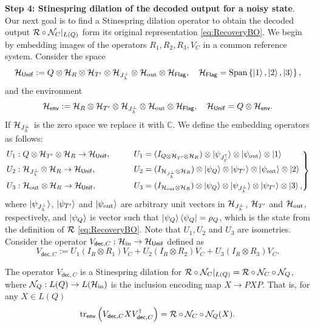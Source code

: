 \documentclass[10pt]{article}
\DeclareMathOperator{\Span}{Span}
\newcommand{\SIN}{\mathrm{in}}
\newcommand{\SOUT}{\mathrm{out}}
\newcommand{\tr}{\mathrm{tr}}
\newcommand{\C}{\mathbb{C}}
\newcommand{\p}[1]{\left(#1\right)}
\newcommand{\ppp}[1]{\left\{#1\right\}}
\newcommand{\s}[1]{\mathsf{#1}}
\begin{document}
\noindent\textbf{Step 4: Stinespring dilation of the decoded output for a noisy state}. Our next goal is to find a Stinespring dilation operator to obtain the decoded output ${\cal R}\circ{\cal N}_C|_{L(Q)}$ form its original representation \eqref{eq:RecoveryBO}. We begin by embedding images of the operators $R_1,R_2,R_3, V_{C}$ in a common reference system. Consider the space
\[\calH_{\s{Unif}}:=Q\otimes \calH_{R}\otimes \calH_{T'}\otimes \calH_{J_{\lambda}^\perp}\otimes \calH_{\SOUT}\otimes \calH_{\s{Flag}}, \quad \calH_{\s{Flag}}=\Span\ppp{\ket{1},\ket{2},\ket{3}},\]
and the environment 
\begin{equation}
    \calH_{\s{env}}:= \calH_{R}\otimes \calH_{T'}\otimes \calH_{J_{\lambda}^\perp}\otimes \calH_{\SOUT}\otimes \calH_{\s{Flag}}, \quad  \calH_{\s{Unif}}=Q\otimes \calH_{\s{env}}.\label{eq:Henv}
\end{equation}
If ${\cal H}_{J_{\lambda}^{\perp}}$ is the zero space we replace it with $\C$. We define the embedding operators as follows: 
    \begin{equation}
\left.
\begin{aligned}
&U_1:Q\otimes \calH_{T'}\otimes \calH_R\to \calH_{\s{Unif}},
\qquad&&U_1= (I_{Q\otimes \calH_{T'}\otimes \calH_R})\otimes \ket{\psi_{J_\calE^\dag}}
\otimes \ket{\psi_{\SOUT}}\otimes \ket{1}\\
&U_2:\calH_{J_{\lambda}^\perp}\otimes \calH_R\to \calH_{\s{Unif}},
&&U_2= (I_{\calH_{J_{\lambda}^\perp}\otimes \calH_R})\otimes \ket{\psi_Q}
\otimes \ket{\psi_{T'}}\otimes \ket{\psi_{\SOUT}}\otimes \ket{2}\\
&U_3:\calH_{\SOUT}\otimes \calH_R\to \calH_{\s{Unif}},
&&U_3= (I_{\calH_{\SOUT}\otimes \calH_R})\otimes \ket{\psi_Q}
\otimes \ket{\psi_{J_{\lambda}^{\perp}}}\otimes \ket{\psi_{T'}}\otimes \ket{3},
\end{aligned}\label{eq:UiDef}
\right\}
\end{equation}
    where $ \ket{\psi_{J_{\lambda}^{\perp}}}$, $  \ket{\psi_{T'}}$ and $\ket{\psi_{\SOUT}}$ are arbitrary unit vectors in ${\cal H}_{J_{\lambda}^\perp}$, ${\cal H}_{T'}$ and $\calH_{\SOUT}$, respectively, and $\ket{\psi_{Q}} $ is vector such that $\ket{\psi_{Q}} \bra{\psi_{Q}} =\rho_Q$, which is the state from the definition of ${\cal R}$ \eqref{eq:RecoveryBO}. 
    Note that $U_1,U_2$ and $U_3$ are isometries. Consider the operator $V_{\s{dec},C}:\calH_{\SIN} \to \calH_{\s{Unif}}$ defined as
    \[V_{\s{dec},C}:=U_1(I_{R}\otimes R_1)V_C+U_2(I_{R}\otimes R_2)V_C+ U_3(I_{R}\otimes R_3)V_C.\]
    \begin{lemma}\label{lem:dilationDecodedState}
        The operator $V_{\s{dec},C}$ is a Stinespring dilation for ${\cal R} \circ{\cal N}_C|_{L(Q)}={\cal R} \circ{\cal N}_C\circ {\cal N}_Q$, where $\calN_Q:L(Q)\to L(\calH_{\SIN})$ is the inclusion encoding map $X\to PXP$. That is, for any $X\in L(Q)$
        \[\tr_{{\s{env}}}\p{V_{\s{dec},C}X V_{\s{dec},C}^\dag}=\calR \circ\calN_C\circ\calN_Q(X).
        \]
    \end{lemma}
\end{document}
